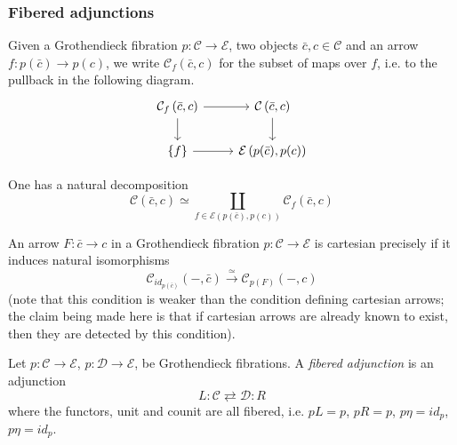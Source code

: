 \documentclass[a4paper,10pt
,draft
]{article}%
\renewcommand{\1}{\eta}%
\begin{document}
\subsubsection{Fibered adjunctions}

\begin{notation}
Given a Grothendieck fibration $p\colon \mathcal{C} \to \mathcal{E}$, 
two objects $\bar{c},c \in \mathcal{C}$
and an arrow $f \colon p(\bar{c}) \to p(c)$, 
we write $\mathcal{C}_f(\bar{c},c)$ for the subset of maps over $f$, i.e. to the pullback in the following diagram.
\begin{equation}
\begin{tikzcd}
		\mathcal{C}_f\left(\bar{c},c \right) \arrow[d] \arrow[r]
	&
		\mathcal{C}\left(\bar{c},c \right) \arrow[d]
\\
		\{f\} \arrow[r]
	&
		\mathcal{E}\left(p(\bar{c}),p(c)\right)
\end{tikzcd}
\end{equation}
\end{notation}


\begin{remark}
One has a natural decomposition
\begin{equation}
	\mathcal{C}(\bar{c},c) \simeq \coprod_{f \in \mathcal{E}(p(\bar{c}),p(c))} \mathcal{C}_f\left(\bar{c},c \right)
\end{equation}
\end{remark}


\begin{remark}\label{CARTCHAR REM}
An arrow $F\colon \bar{c} \to c$ in a Grothendieck fibration
$p \colon \mathcal{C} \to \mathcal{E}$ is cartesian
precisely if it induces natural isomorphisms
\[
\mathcal{C}_{id_{p(\bar{c})}}
\left(- ,\bar{c} \right)
\xrightarrow{\simeq}
\mathcal{C}_{p(F)}\left(- ,c \right)
\]
(note that this condition is weaker than the condition defining cartesian arrows; the claim being made here is that if cartesian arrows are already known to exist, then they are detected by this condition).
\end{remark}



\begin{definition}
Let 
$p\colon \mathcal{C} \to \mathcal{E}$,
$p\colon \mathcal{D} \to \mathcal{E}$,
be Grothendieck fibrations.
A \emph{fibered adjunction} is an adjunction
\[
L \colon \mathcal{C} \rightleftarrows \mathcal{D} \colon R
\]
where the functors, unit and counit are all fibered, i.e.
$pL=p$, $pR=p$, $p \eta = id_{p}$, $p\eta = id_p$.
\end{definition}
\end{document}
